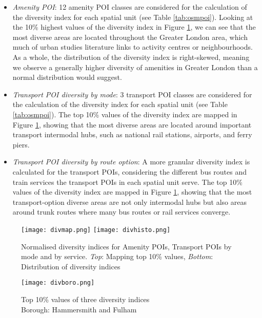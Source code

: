 \begin{itemize}
    \setlength\itemsep{0em}
    \item \textit{Amenity POI}: 12 amenity POI classes are considered for the calculation of the diversity index for each spatial unit (see Table \ref{tab:osmpoi}). Looking at the 10\% highest values of the diversity index in Figure \ref{fig:diversity}, we can see that the most diverse areas are located throughout the Greater London area, which much of urban studies literature links to activity centres or neighbourhoods. As a whole, the distribution of the diversity index is right-skewed, meaning we observe a generally higher diversity of amenities in Greater London than a normal distribution would suggest.
    \item \textit{Transport POI diversity by mode}: 3 transport POI classes are considered for the calculation of the diversity index for each spatial unit (see Table \ref{tab:osmpoi}). The top 10\% values of the diversity index are mapped in Figure \ref{fig:diversity}, showing that the most diverse areas are located around important transport intermodal hubs, such as national rail stations, airports, and ferry piers.
    \item \textit{Transport POI diversity by route option}: A more granular diversity index is calculated for the transport POIs, considering the different bus routes and train services the transport POIs in each spatial unit serve. The top 10\% values of the diversity index are mapped in Figure \ref{fig:diversity}, showing that the most transport-option diverse areas are not only intermodal hubs but also areas around trunk routes where many bus routes or rail services converge.
\end{itemize}

\begin{figure}[ht]
    \centering
    \texttt{[image: divmap.png]}
    \centering
    \texttt{[image: divhisto.png]}
    \captionsetup{justification=centering}
    \caption{Normalised diversity indices for Amenity POIs, Transport POIs by mode and by service. \textit{Top}: Mapping top 10\% values, \textit{Bottom}: Distribution of diversity indices}
    \label{fig:diversity}
\end{figure}

\begin{figure}[!hbt]
    \centering
    \texttt{[image: divboro.png]}
    \captionsetup{justification=centering}
    \caption{Top 10\% values of three diversity indices\\Borough: Hammersmith and Fulham}
    \label{fig:diversityboro}
\end{figure}

